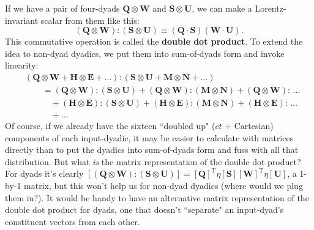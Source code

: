 \documentclass[12pt]{article}
\renewcommand{\vv}[1]{\mathbf{#1}}
\begin{document}
If we have a pair of four-dyads $\vv Q \otimes \vv W$ and $\vv S \otimes \vv U$, we can make a Lorentz-invariant scalar from them like this:
\begin{equation*}
(\vv Q \otimes \vv W) : (\vv S \otimes \vv U) \equiv (\vv Q \cdot \vv S) (\vv W \cdot \vv U).
\end{equation*}
This commutative operation is called the \textbf{double dot product}. To extend the idea to non-dyad dyadics, we put them into sum-of-dyads form and invoke linearity:
\begin{equation*}
\begin{aligned}
&(\vv Q \otimes \vv W + \vv H \otimes \vv E + \dots) : (\vv S \otimes \vv U + \vv M \otimes \vv N + \dots) \\[3pt]
&\qquad = (\vv Q \otimes \vv W) : (\vv S \otimes \vv U) + (\vv Q \otimes \vv W) : (\vv M \otimes \vv N) + (\vv Q \otimes \vv W) : \, \dots \\
& \qquad \quad + (\vv H \otimes \vv E) : (\vv S \otimes \vv U) + (\vv H \otimes \vv E) : (\vv M \otimes \vv N) + (\vv H \otimes \vv E) : \, \dots \\
& \qquad \quad + \dots
\end{aligned}
\end{equation*}
Of course, if we already have the sixteen ``doubled up" ($ct$ + Cartesian) components of each input-dyadic, it may be easier to calculate with matrices directly than to put the dyadics into sum-of-dyads form and fuss with all that distribution. But what \emph{is} the matrix representation of the double dot product? For dyads it's clearly $[ (\vv Q \otimes \vv W) : (\vv S \otimes \vv U) ] = [\vv Q]^{\mathrm{T}} \eta [\vv S] [\vv W]^{\mathrm{T}} \eta [\vv U]$, a 1-by-1 matrix, but this won't help us for non-dyad dyadics (where would we plug them in?). It would be handy to have an alternative matrix representation of the double dot product for dyads, one that doesn't ``separate" an input-dyad's constituent vectors from each other.
\end{document}
